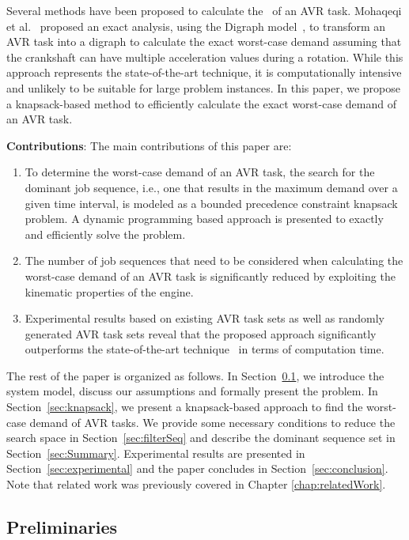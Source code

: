 Several methods have been proposed to calculate the \dbf~of an AVR task.
Mohaqeqi et al.~\cite{mohaqeqi_refinement_2017} proposed an exact analysis, using the Digraph model~\cite{stigge_digraph_2011}, to transform an AVR task into a digraph to calculate the exact worst-case demand assuming that the crankshaft can have multiple acceleration values during a rotation.
While this approach represents the state-of-the-art technique, it is computationally intensive and unlikely to be suitable for large problem instances.
In this paper, we propose a knapsack-based method to efficiently calculate the exact worst-case demand of an AVR task.

\noindent \textbf{Contributions}: The main contributions of this paper are:
\begin{enumerate}
\item To determine the worst-case demand of an AVR task, the search for the dominant job sequence, i.e., one that results in the maximum demand over a given time interval, is modeled as a bounded precedence constraint knapsack problem.
A dynamic programming based approach is presented to exactly and efficiently solve the problem.
\item  The number of job sequences that need to be considered when calculating the worst-case demand of an AVR task is significantly reduced by exploiting the kinematic properties of the engine.
\item Experimental results based on existing AVR task sets as well as randomly generated AVR task sets reveal that the proposed approach significantly outperforms the state-of-the-art technique~\cite{mohaqeqi_refinement_2017} in terms of computation time.
\end{enumerate}

The rest of the paper is organized as follows.
In Section~\ref{sec:prelims}, we introduce the system model, discuss our assumptions and formally present the problem.
In Section~\ref{sec:knapsack}, we present a knapsack-based approach to find the worst-case demand of AVR tasks. %
We provide some necessary conditions to reduce the search space in Section~\ref{sec:filterSeq} and describe the dominant sequence set in Section~\ref{sec:Summary}.
Experimental results are presented in Section~\ref{sec:experimental} and the paper concludes in Section~\ref{sec:conclusion}.
Note that related work was previously covered in Chapter \ref{chap:relatedWork}.

\subsection{Preliminaries}
\label{sec:prelims}

